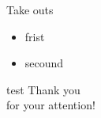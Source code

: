 \begin{frame}{Take outs}
    \begin{itemize}
        \item frist
        \item secound
    \end{itemize}
\end{frame}

\begin{frame}{test}
\huge
\textcolor{kit-green100}{Thank you \\for your attention!}
\end{frame}
